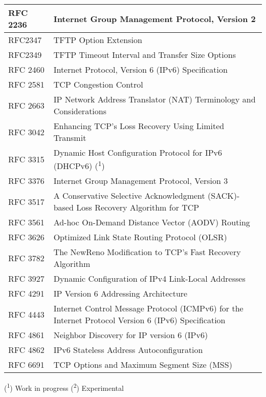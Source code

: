 \begin{longtable}{ | l | p{15cm} | }
RFC 2236 &
Internet Group Management Protocol, Version 2 \\ \hline

RFC2347 &
TFTP Option Extension \\ \hline

RFC2349 &
TFTP Timeout Interval and Transfer Size Options \\ \hline

RFC 2460 &
Internet Protocol, Version 6 (IPv6) Specification \\ \hline

RFC 2581 &
TCP Congestion Control \\ \hline

RFC 2663 &
IP Network Address Translator (NAT) Terminology and Considerations \\ \hline

RFC 3042 &
Enhancing TCP's Loss Recovery Using Limited Transmit \\ \hline

RFC 3315 &
Dynamic Host Configuration Protocol for IPv6 (DHCPv6) (\textsuperscript{1}) \\ \hline

RFC 3376 &
Internet Group Management Protocol, Version 3 \\ \hline

RFC 3517 &
A Conservative Selective Acknowledgment (SACK)-based Loss Recovery Algorithm for TCP \\ \hline

RFC 3561 &
Ad-hoc On-Demand Distance Vector (AODV) Routing \\ \hline

RFC 3626 &
Optimized Link State Routing Protocol (OLSR) \\ \hline

RFC 3782 &
The NewReno Modification to TCP's Fast Recovery Algorithm \\ \hline

RFC 3927 &
Dynamic Configuration of IPv4 Link-Local Addresses \\ \hline

RFC 4291 &
IP Version 6 Addressing Architecture \\ \hline

RFC 4443 &
Internet Control Message Protocol (ICMPv6) for the Internet Protocol Version 6 (IPv6) Specification \\ \hline

RFC 4861 &
Neighbor Discovery for IP version 6 (IPv6) \\ \hline

RFC 4862 &
IPv6 Stateless Address Autoconfiguration \\ \hline

RFC 6691 &
TCP Options and Maximum Segment Size (MSS) \\ \hline

\end{longtable}

(\textsuperscript{1}) Work in progress
(\textsuperscript{2}) Experimental
